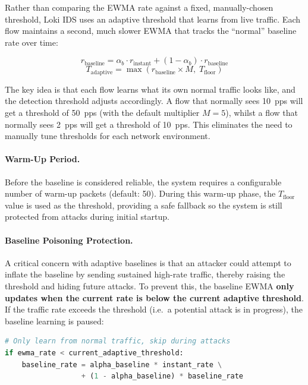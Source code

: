 \documentclass[12pt,a4paper]{article}
\begin{document}
Rather than comparing the EWMA rate against a fixed, manually-chosen threshold, Loki IDS uses an adaptive threshold that learns from live traffic. Each flow maintains a second, much slower EWMA that tracks the ``normal'' baseline rate over time:

\begin{equation}
    r_{\text{baseline}} = \alpha_b \cdot r_{\text{instant}} + (1 - \alpha_b) \cdot r_{\text{baseline}}
\end{equation}
\begin{equation}
    T_{\text{adaptive}} = \max\!\left(r_{\text{baseline}} \times M,\; T_{\text{floor}}\right)
\end{equation}

The key idea is that each flow learns what its own normal traffic looks like, and the detection threshold adjusts accordingly. A flow that normally sees 10~pps will get a threshold of 50~pps (with the default multiplier $M=5$), whilst a flow that normally sees 2~pps will get a threshold of 10~pps. This eliminates the need to manually tune thresholds for each network environment.

\paragraph{Warm-Up Period.}
Before the baseline is considered reliable, the system requires a configurable number of warm-up packets (default: 50). During this warm-up phase, the $T_{\text{floor}}$ value is used as the threshold, providing a safe fallback so the system is still protected from attacks during initial startup.

\paragraph{Baseline Poisoning Protection.}
A critical concern with adaptive baselines is that an attacker could attempt to inflate the baseline by sending sustained high-rate traffic, thereby raising the threshold and hiding future attacks. To prevent this, the baseline EWMA \textbf{only updates when the current rate is below the current adaptive threshold}. If the traffic rate exceeds the threshold (i.e.\ a potential attack is in progress), the baseline learning is paused:

\begin{lstlisting}[language=python]
# Only learn from normal traffic, skip during attacks
if ewma_rate < current_adaptive_threshold:
    baseline_rate = alpha_baseline * instant_rate \
                  + (1 - alpha_baseline) * baseline_rate
\end{lstlisting}
\end{document}
